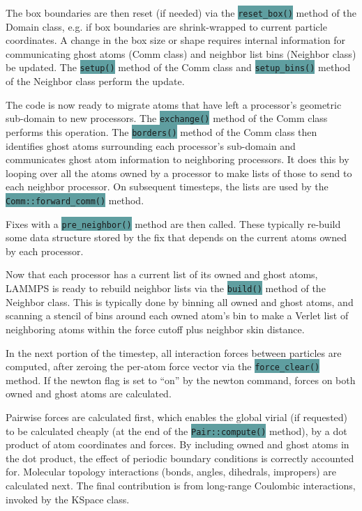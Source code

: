 \documentclass{article}
\newcommand{\code}[1]{\colorbox{cadetblue}{\color{white}\texttt{#1}}}
\begin{document}
The box boundaries are then reset (if needed) via the \code{reset\_box()} method
of the Domain class, e.g. if box boundaries are shrink-wrapped to current
particle coordinates. A change in the box size or shape requires internal
information for communicating ghost atoms (Comm class) and neighbor list bins
(Neighbor class) be updated. The \code{setup()} method of the Comm class and
\code{setup\_bins()} method of the Neighbor class perform the update.

The code is now ready to migrate atoms that have left a processor's
geometric sub-domain to new processors.  The \code{exchange()} method of the
Comm class performs this operation.  The \code{borders()} method of the Comm
class then identifies ghost atoms surrounding each processor's
sub-domain and communicates ghost atom information to neighboring
processors.  It does this by looping over all the atoms owned by a
processor to make lists of those to send to each neighbor processor.
On subsequent timesteps, the lists are used by the
\code{Comm::forward\_comm()} method.

Fixes with a \code{pre\_neighbor()} method are then called. These typically
re-build some data structure stored by the fix that depends on the current atoms
owned by each processor.

Now that each processor has a current list of its owned and ghost
atoms, LAMMPS is ready to rebuild neighbor lists via the \code{build()}
method of the Neighbor class.  This is typically done by binning all
owned and ghost atoms, and scanning a stencil of bins around each
owned atom's bin to make a Verlet list of neighboring atoms within the
force cutoff plus neighbor skin distance.

In the next portion of the timestep, all interaction forces between
particles are computed, after zeroing the per-atom force vector via
the \code{force\_clear()} method.  If the newton flag is set to ``on'' by the
newton command, forces on both owned and ghost atoms are calculated.

Pairwise forces are calculated first, which enables the global virial
(if requested) to be calculated cheaply (at the end of the
\code{Pair::compute()} method), by a dot product of atom coordinates and
forces.  By including owned and ghost atoms in the dot product, the
effect of periodic boundary conditions is correctly accounted for.
Molecular topology interactions (bonds, angles, dihedrals, impropers)
are calculated next.  The final contribution is from long-range
Coulombic interactions, invoked by the KSpace class.
\end{document}
